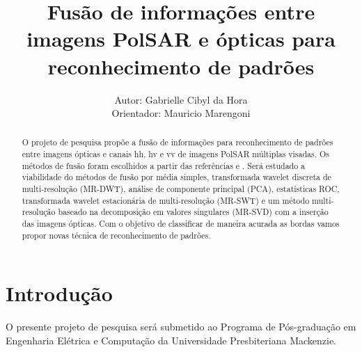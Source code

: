 \documentclass[runningheads]{llncs}
\begin{document}
%
\title{Fusão de informações entre imagens PolSAR e ópticas para reconhecimento de padrões}
%
%
\pagestyle{plain}
\author{Autor: Gabrielle Cibyl da Hora \\ 
Orientador: Mauricio Marengoni} 
%
%
%
\maketitle              %
%
\begin{abstract}
O projeto de pesquisa propõe a fusão de informações para reconhecimento de padrões entre imagens ópticas e canais hh, hv e vv de imagens PolSAR múltiplas visadas. Os métodos de fusão foram escolhidos a partir das referências \cite{bmf_2020} e \cite{ref_proc4}.  Será estudado a viabilidade do métodos de fusão por média simples, transformada wavelet discreta de multi-resolução (MR-DWT), análise de componente principal (PCA), estatísticas ROC, transformada wavelet estacionária de multi-resolução (MR-SWT) e um método multi-resolução baseado na decomposição em valores singulares (MR-SVD) com a inserção das imagens ópticas. Com o objetivo de classificar de maneira acurada as bordas vamos propor novas técnica de reconhecimento de padrões. 

\addto\captionsenglish{\renewcommand{\keywordsname}{Palavras-chave}}
\end{abstract}
%
%
\section{Introdução}

O presente projeto de pesquisa será submetido ao Programa de Pós-graduação em Engenharia Elétrica e Computação da Universidade Presbiteriana Mackenzie. 
\end{document}
